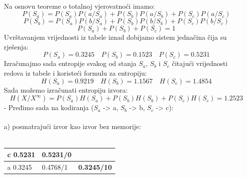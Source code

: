 \documentclass[12pt]{article}
\begin{document}
\begin{enumerate}
\\
\newpage

Na osnovu teoreme o totalnoj vjerovatnoći imamo: \\
\begin{equation*}
    P(S_a) = P(S_a)P(a/S_a) + P(S_b)P(a/S_b) + P(S_c)P(a/S_c)
\end{equation*} 
\begin{equation*}
    P(S_b) = P(S_a)P(b/S_a) + P(S_b)P(b/S_b) + P(S_c)P(b/S_c)
\end{equation*} 
\begin{equation*}
    P(S_a) + P(S_b) + P(S_c) = 1
\end{equation*}
Uvrštavanjem vrijednosti iz tabele iznad dobijamo sistem jednačina čija
su rješenja:
\begin{equation*}
    P(S_a) = 0.3245 \quad P(S_b) = 0.1523 \quad P(S_c) = 0.5231
\end{equation*}
Izračunajmo sada entropije svakog od stanja $S_a$, $S_b$ i $S_c$ čitajući vrijednosti
redova iz tabele i koristeći formulu za entropiju:
\begin{equation*}
    H(S_a) = 0.9219 \quad H(S_b) = 1.1567 \quad H(S_c) = 1.4854
\end{equation*}
Sada možemo izračunati entropiju izvora:
\begin{equation*}
    H(X/X^\infty) = P(S_a)H(S_a) + P(S_b)H(S_b) + P(S_c)H(S_c) = 1.2523
\end{equation*}
- Pređimo sada na kodiranja ($S_a$ -> a, $S_b$ -> b, $S_c$ -> c): \\
\\
a) posmatrajući izvor kao izvor bez memorije:
\\
\\
\begin{tabular}{|l|l|l}
\cline{1-2}
c 0.5231 & \textbf{0.5231/0} &                                            \\ \hline
a 0.3245 & 0.4768/1          & \multicolumn{1}{l|}{\textbf{0.3245/10}} \\ \cline{1-1} \cline{3-3} 

\end{tabular}
\end{enumerate}
\end{document}

